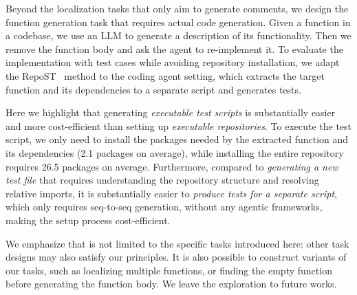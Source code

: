 Beyond the localization tasks that only aim to generate comments, we design the function generation task that requires actual code generation. 
Given a function in a codebase, we use an LLM to generate a description of its functionality.
Then we remove the function body and ask the agent to re-implement it.
To evaluate the implementation with test cases while avoiding repository installation, we adapt the RepoST~\cite{repost} method to the coding agent setting, which extracts the target function and its dependencies to a separate script and generates tests.

Here we highlight that generating \emph{executable test scripts} is substantially easier and more cost-efficient than setting up \emph{executable repositories}.
To execute the test script, we only need to install the packages needed by the extracted function and its dependencies (2.1 packages on average), while installing the entire repository requires 26.5 packages on average.
Furthermore, compared to \emph{generating a new test file} that requires understanding the repository structure and resolving relative imports, it is substantially easier to \emph{produce tests for a separate script}, which only requires seq-to-seq generation, without any agentic frameworks, making the setup process cost-efficient.

We emphasize that \hybridmethodname is not limited to the specific tasks introduced here: other task designs may also satisfy our principles.
It is also possible to construct variants of our tasks, such as localizing multiple functions, or finding the empty function before generating the function body. We leave the exploration to future works. 

